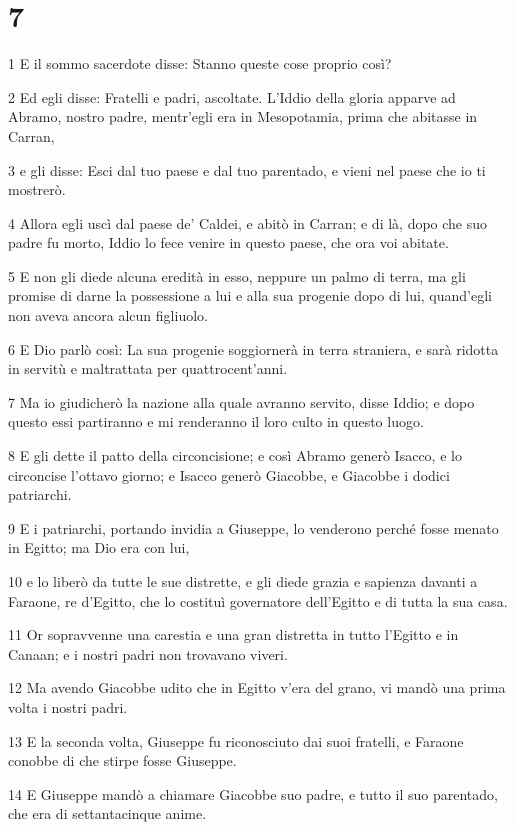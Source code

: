 \chapter{7}

\par 1 E il sommo sacerdote disse: Stanno queste cose proprio così?
\par 2 Ed egli disse: Fratelli e padri, ascoltate. L'Iddio della gloria apparve ad Abramo, nostro padre, mentr'egli era in Mesopotamia, prima che abitasse in Carran,
\par 3 e gli disse: Esci dal tuo paese e dal tuo parentado, e vieni nel paese che io ti mostrerò.
\par 4 Allora egli uscì dal paese de' Caldei, e abitò in Carran; e di là, dopo che suo padre fu morto, Iddio lo fece venire in questo paese, che ora voi abitate.
\par 5 E non gli diede alcuna eredità in esso, neppure un palmo di terra, ma gli promise di darne la possessione a lui e alla sua progenie dopo di lui, quand'egli non aveva ancora alcun figliuolo.
\par 6 E Dio parlò così: La sua progenie soggiornerà in terra straniera, e sarà ridotta in servitù e maltrattata per quattrocent'anni.
\par 7 Ma io giudicherò la nazione alla quale avranno servito, disse Iddio; e dopo questo essi partiranno e mi renderanno il loro culto in questo luogo.
\par 8 E gli dette il patto della circoncisione; e così Abramo generò Isacco, e lo circoncise l'ottavo giorno; e Isacco generò Giacobbe, e Giacobbe i dodici patriarchi.
\par 9 E i patriarchi, portando invidia a Giuseppe, lo venderono perché fosse menato in Egitto; ma Dio era con lui,
\par 10 e lo liberò da tutte le sue distrette, e gli diede grazia e sapienza davanti a Faraone, re d'Egitto, che lo costituì governatore dell'Egitto e di tutta la sua casa.
\par 11 Or sopravvenne una carestia e una gran distretta in tutto l'Egitto e in Canaan; e i nostri padri non trovavano viveri.
\par 12 Ma avendo Giacobbe udito che in Egitto v'era del grano, vi mandò una prima volta i nostri padri.
\par 13 E la seconda volta, Giuseppe fu riconosciuto dai suoi fratelli, e Faraone conobbe di che stirpe fosse Giuseppe.
\par 14 E Giuseppe mandò a chiamare Giacobbe suo padre, e tutto il suo parentado, che era di settantacinque anime.
